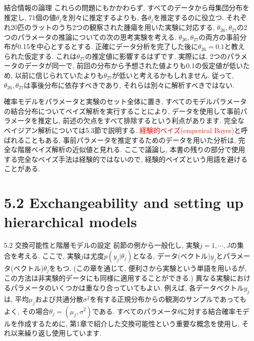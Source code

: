 \documentclass[10pt,dvipdfmx,a4]{beamer}
\newcommand{\tcr}[1]{\textcolor{red}{#1}}
\begin{document}
\begin{frame}{結合情報の論理}
これらの問題にもかかわらず, すべてのデータから母集団分布を推定し, 71個の値$\theta_j$を別々に推定するよりも, 各$\theta_j$を推定するのに役立つ.
それぞれ20匹のラットのうち2つの観察された腫瘍を用いた実験に対応する, $\theta_{26}, \theta_{27}$の2つのパラメータの推論についての次の思考実験を考える.
$\theta_{26}, \theta_{27}$の両方の事前分布が0.15を中心とするとする.
正確にデータ分析を完了した後に$\theta_{26}= 0.1$と教えられた仮定する.
これは$\theta_{27}$の推定値に影響するはずです.
実際には, 2つのパラメータのデータが同一で, 前回の分布から予想された値よりも0.1の仮定値が低いため, 以前に信じられていたよりも$\theta_{27}$が低いと考えるかもしれません.
従って, $\theta_{26}, \theta_{27}$は事後分布に依存すべきであり, それらは別々に解析すべきではない.

確率モデルをパラメータと実験のセット全体に置き, すべてのモデルパラメータの結合分布についてベイズ解析を実行することにより, データを使用して事前パラメータを推定し, 前述の欠点をすべて排除するという利点があります.
完全なベイジアン解析については5.3節で説明する.
\tcr{経験的ベイズ(emperical Bayes)}と呼ばれることもある, 事前パラメータを推定するためのデータを用いた分析は, 完全な階層ベイズ解析の近似値と見れる.
ここで議論し, 本書の残りの部分で使用する完全なベイズ手法は経験的ではないので, 経験的ベイズという用語を避けることがある.
\end{frame}

\section{5.2 Exchangeability and setting up hierarchical models}
\begin{frame}{5.2 交換可能性と階層モデルの設定}
前節の例から一般化し, 実験$j=1,\cdots,J$の集合を考える.
ここで, 実験$j$は尤度$p(y_j|\theta_j)$となる, データ(ベクトル)$y_j$とパラメータ(ベクトル)$\theta_j$をもつ.
(この章を通じて, 便利さから実験という単語を用いるが, この方法は非実験的データにも同様に適用することができる.)
異なる実験におけるパラメータのいくつかは重なり合っていてもよい.
例えば, 各データベクトル$y_j$は, 平均$\mu_j$および共通分散$\sigma^2$を有する正規分布からの観測のサンプルであってもよく, その場合$\theta_j=(\mu_j, \sigma^2)$である.
すべてのパラメータ$\theta$に対する結合確率モデルを作成するために, 第1章で紹介した交換可能性という重要な概念を使用し, それ以来繰り返し使用しています.
\end{frame}

\end{document}
